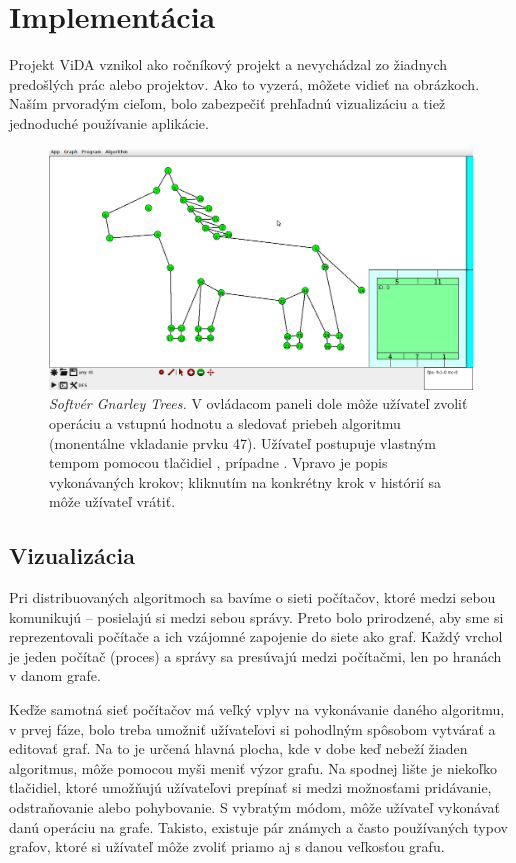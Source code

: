 \section{Implementácia}

Projekt ViDA vznikol ako ročníkový projekt a nevychádzal zo žiadnych predošlých prác alebo
projektov. Ako to vyzerá, môžete vidieť na obrázkoch.
Naším prvoradým cieľom, bolo zabezpečiť prehľadnú vizualizáciu a tiež jednoduché
používanie aplikácie.

\noindent
\begin{figure}
\centering
\includegraphics[width=2.01\columnwidth]{konik-je-uzasny.png}
\caption{\emph{Softvér Gnarley Trees.} V ovládacom paneli dole môže užívateľ
zvoliť operáciu a vstupnú hodnotu a sledovať priebeh algoritmu (monentálne vkladanie
prvku 47). Užívateľ postupuje vlastným tempom  pomocou tlačidiel , prípadne
. Vpravo je popis vykonávaných krokov; kliknutím na konkrétny krok v histórií
sa môže užívateľ vrátiť.}
\label{img:historia} 
\end{figure}

\subsection{Vizualizácia}

Pri distribuovaných algoritmoch sa bavíme o sieti počítačov, ktoré medzi sebou komunikujú --
posielajú si medzi sebou správy. Preto bolo prirodzené, aby sme si reprezentovali počítače a ich
vzájomné zapojenie do siete ako graf. Každý vrchol je jeden počítač (proces) a správy sa presúvajú
medzi počítačmi, len po hranách v danom grafe.

Keďže samotná sieť počítačov má veľký vplyv na vykonávanie daného algoritmu, v prvej fáze, bolo
treba umožniť užívateľovi si pohodlným spôsobom vytvárať a editovať graf. Na to je určená hlavná
plocha, kde v dobe keď nebeží žiaden algoritmus, môže pomocou myši meniť výzor grafu. Na spodnej
lište je niekoľko tlačidiel, ktoré umožňujú užívateľovi prepínať si medzi možnosťami pridávanie,
odstraňovanie alebo pohybovanie. S vybratým módom, môže užívateľ vykonávať danú operáciu na grafe.
Takisto, existuje pár známych a často používaných typov grafov, ktoré si užívateľ môže zvoliť priamo
aj s danou veľkosťou grafu.


